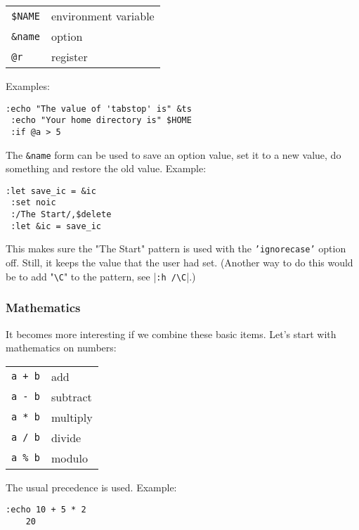 \begin{center} \begin{tabular}{l l}
				\texttt{\$NAME} & environment variable \\
				\texttt{\&name} & option \\
				\texttt{@r} & register \\
\end{tabular} \end{center}

Examples:

\begin{Verbatim}[samepage=true]
 :echo "The value of 'tabstop' is" &ts
 :echo "Your home directory is" $HOME
 :if @a > 5
\end{Verbatim}

The \texttt{\&name} form can be used to save an option value, set it to a new value, do something and restore the old value.
Example:

\begin{Verbatim}[samepage=true]
 :let save_ic = &ic
 :set noic
 :/The Start/,$delete
 :let &ic = save_ic
\end{Verbatim}

This makes sure the "The Start" pattern is used with the \texttt{'ignorecase'} option off.
Still, it keeps the value that the user had set.
(Another way to do this would be to add "\texttt{\textbackslash{}C}" to the pattern, see |\texttt{:h /\textbackslash{}C}|.)

\subsubsection{Mathematics}
It becomes more interesting if we combine these basic items.
Let's start with mathematics on numbers:

\begin{center} \begin{tabular}{l l}
				\texttt{a + b} & add \\
				\texttt{a - b} & subtract \\
				\texttt{a * b} & multiply \\
				\texttt{a / b} & divide \\
				\texttt{a \% b} & modulo \\
\end{tabular} \end{center}

The usual precedence is used.
Example:

\begin{Verbatim}[samepage=true]
 :echo 10 + 5 * 2
    20
\end{Verbatim}

